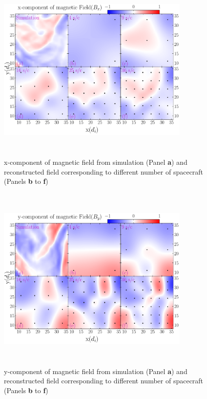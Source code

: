         \begin{figure}
            \begin{center}
                \includegraphics[width=0.85\textwidth, height=3.65in]{figures/chap8/all_spc_bx_4_9_16_25_36_001_cas1.pdf}
                \caption[Reconstructed field (x-component), linear configuration]{x-component of
                magnetic field from simulation (Panel \textbf{a}) and reconstructed field
                corresponding to different number of spacecraft (Panels \textbf{b} to \textbf{f})}
                \label{fig:gpr_cas_bx}
            \end{center}
        \end{figure}

        \begin{figure}
            \begin{center}
                \includegraphics[width=0.85\textwidth, height=3.65in]{figures/chap8/all_spc_by_4_9_16_25_36_001_cas1.pdf}
                \caption[Reconstructed field (y-component), linear configuration]{y-component of
                magnetic field from simulation (Panel \textbf{a}) and reconstructed field
                corresponding to different number of spacecraft (Panels \textbf{b} to \textbf{f})}
                \label{fig:gpr_cas_by}
            \end{center}
        \end{figure}

